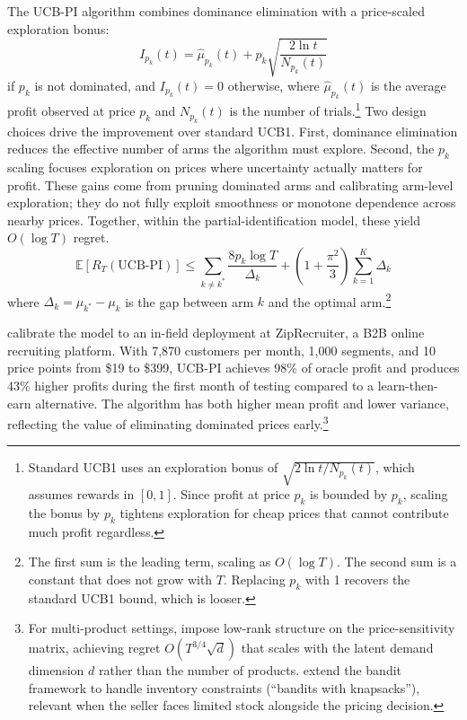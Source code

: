 The UCB-PI algorithm combines dominance elimination with a price-scaled exploration bonus:
\begin{equation}
\label{eq:ucbpi}
I_{p_k}(t) = \hat{\mu}_{p_k}(t) + p_k \sqrt{\frac{2 \ln t}{N_{p_k}(t)}}
\end{equation}
if $p_k$ is not dominated, and $I_{p_k}(t) = 0$ otherwise, where $\hat{\mu}_{p_k}(t)$ is the average profit observed at price $p_k$ and $N_{p_k}(t)$ is the number of trials.\footnote{Standard UCB1 uses an exploration bonus of $\sqrt{2\ln t / N_{p_k}(t)}$, which assumes rewards in $[0,1]$. Since profit at price $p_k$ is bounded by $p_k$, scaling the bonus by $p_k$ tightens exploration for cheap prices that cannot contribute much profit regardless.} Two design choices drive the improvement over standard UCB1. First, dominance elimination reduces the effective number of arms the algorithm must explore. Second, the $p_k$ scaling focuses exploration on prices where uncertainty actually matters for profit. These gains come from pruning dominated arms and calibrating arm-level exploration; they do not fully exploit smoothness or monotone dependence across nearby prices. Together, within the partial-identification model, these yield $O(\log T)$ regret.
\begin{equation}
\mathbb{E}[R_T(\text{UCB-PI})] \leq \sum_{k \neq k^*} \frac{8 p_k \log T}{\Delta_k} + \left(1 + \frac{\pi^2}{3}\right) \sum_{k=1}^K \Delta_k
\end{equation}
where $\Delta_k = \mu_{k^*} - \mu_k$ is the gap between arm $k$ and the optimal arm.\footnote{The first sum is the leading term, scaling as $O(\log T)$. The second sum is a constant that does not grow with $T$. Replacing $p_k$ with 1 recovers the standard UCB1 bound, which is looser.}

\citet{Misra2019} calibrate the model to an in-field deployment at ZipRecruiter, a B2B online recruiting platform. With 7,870 customers per month, 1,000 segments, and 10 price points from \$19 to \$399, UCB-PI achieves 98\% of oracle profit and produces 43\% higher profits during the first month of testing compared to a learn-then-earn alternative. The algorithm has both higher mean profit and lower variance, reflecting the value of eliminating dominated prices early.\footnote{For multi-product settings, \citet{Mueller2019} impose low-rank structure on the price-sensitivity matrix, achieving regret $O(T^{3/4}\sqrt{d})$ that scales with the latent demand dimension $d$ rather than the number of products. \citet{Badanidiyuru2013} extend the bandit framework to handle inventory constraints (``bandits with knapsacks''), relevant when the seller faces limited stock alongside the pricing decision.}


